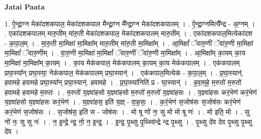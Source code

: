 \documentclass[17pt]{extarticle}
\begin{document}
\textbf{Jatai Paata} \newline

1. ऐ॒न्द्रा॒ग्न मेका॑दशकपाल॒ मेका॑दशकपाल मैन्द्रा॒ग्न मै᳚न्द्रा॒ग्न मेका॑दशकपालम् । . ऐ॒न्द्रा॒ग्नमित्यै᳚न्द्र - अ॒ग्नम् । . एका॑दशकपालम् मारु॒तीम् मा॑रु॒ती मेका॑दशकपाल॒ मेका॑दशकपालम् मारु॒तीम् । . एका॑दशकपाल॒मित्येका॑दश - क॒पा॒ल॒म् । . मा॒रु॒ती मा॒मिक्षा॑ मा॒मिक्षा᳚म् मारु॒तीम् मा॑रु॒ती मा॒मिक्षा᳚म् । . आ॒मिक्षां᳚ ॅवारु॒णीं ॅवा॑रु॒णी मा॒मिक्षा॑ मा॒मिक्षां᳚ ॅवारु॒णीम् । . वा॒रु॒णी मा॒मिक्षा॑ मा॒मिक्षां᳚ ॅवारु॒णीं ॅवा॑रु॒णी मा॒मिक्षा᳚म् । . आ॒मिक्षा᳚म् का॒यम् का॒य मा॒मिक्षा॑ मा॒मिक्षा᳚म् का॒यम् । . का॒य मेक॑कपाल॒ मेक॑कपालम् का॒यम् का॒य मेक॑कपालम् । . एक॑कपालम् प्रघा॒स्या᳚न् प्रघा॒स्या॒ नेक॑कपाल॒ मेक॑कपालम् प्रघा॒स्यान्॑ । . एक॑कपाल॒मित्येक॑ - क॒पा॒ल॒म् । . प्र॒घा॒स्यान्॑. हवामहे हवामहे प्रघा॒स्या᳚न् प्रघा॒स्यान्॑. हवामहे । . प्र॒घा॒स्या॑निति॑ प्र - घा॒स्यान्॑ । . ह॒वा॒म॒हे॒ म॒रुतो॑ म॒रुतो॑ हवामहे हवामहे म॒रुतः॑ । . म॒रुतो॑ य॒ज्ञ्वा॑हसो य॒ज्ञ्वा॑हसो म॒रुतो॑ म॒रुतो॑ य॒ज्ञ्वा॑हसः । . य॒ज्ञ्वा॑हसः करं॒भेण॑ करं॒भेण॑ य॒ज्ञ्वा॑हसो य॒ज्ञ्वा॑हसः करं॒भेण॑ । . य॒ज्ञ्वा॑हस॒ इति॑ य॒ज्ञ् - वा॒ह॒सः॒ । . क॒रं॒भेण॑ स॒जोष॑सः स॒जोष॑सः करं॒भेण॑ करं॒भेण॑ स॒जोष॑सः । . स॒जोष॑स॒ इति॑ स - जोष॑सः । . मो षू णो॑ नः॒ सु मो मो षू णः॑ । . मो इति॒ मो । . सु नो॑ नः॒ सु सु नः॑ । . न॒ इ॒न्द्रे॒ न्द्र॒ नो॒ न॒ इ॒न्द्र॒ । . इ॒न्द्र॒ पृ॒थ्सु पृ॒थ्स्वि॑न्द्रे न्द्र पृ॒थ्सु । . पृ॒थ्सु दे॑व देव पृ॒थ्सु पृ॒थ्सु दे॑व । \newline
\end{document}
